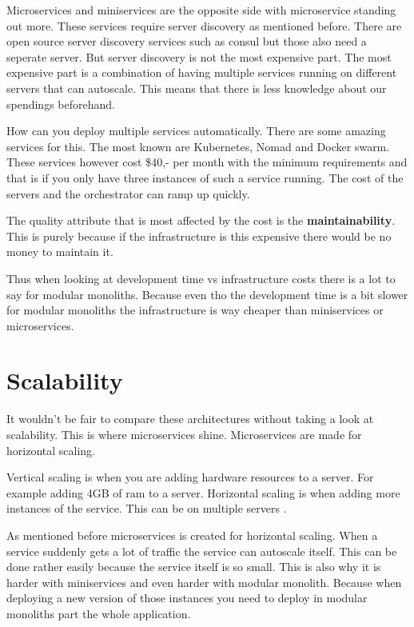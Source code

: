 Microservices and miniservices are the opposite side with microservice standing out more. These services require server discovery as mentioned before. There are open source server discovery services such as consul but those also need a seperate server. But server discovery is not the most expensive part. The most expensive part is a combination of having multiple services running on different servers that can autoscale. This means that there is less knowledge about our spendings beforehand.

How can you deploy multiple services automatically. There are some amazing services for this. The most known are Kubernetes, Nomad and Docker swarm. These services however cost \$40,- per month with the minimum requirements and that is if you only have three instances of such a service running. The cost of the servers and the orchestrator can ramp up quickly.

The quality attribute that is most affected by the cost is the \textbf{maintainability}. This is purely because if the infrastructure is this expensive there would be no money to maintain it.

Thus when looking at development time vs infrastructure costs there is a lot to say for modular monoliths. Because even tho the development time is a bit slower for modular monoliths the infrastructure is way cheaper than miniservices or microservices.

\section{Scalability}
\label{sec:Scalability}

It wouldn’t be fair to compare these architectures without taking a look at scalability. This is where microservices shine. Microservices are made for horizontal scaling.

Vertical scaling is when you are adding hardware resources to a server. For example adding 4GB of ram to a server. Horizontal scaling is when adding more instances of the service. This can be on multiple servers \cite{microservicesMultipleServer}.

As mentioned before microservices is created for horizontal scaling. When a service suddenly gets a lot of traffic the service can autoscale itself. This can be done rather easily because the service itself is so small. This is also why it is harder with miniservices and even harder with modular monolith. Because when deploying a new version of those instances you need to deploy in modular monoliths part the whole application.

